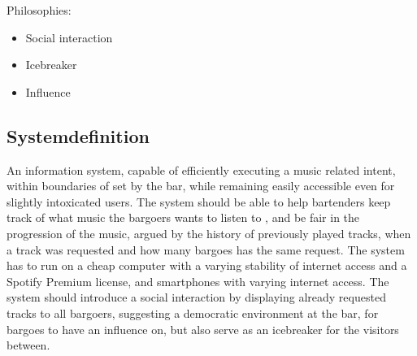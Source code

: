 Philosophies:
\begin{itemize}
	\item Social interaction
	\item Icebreaker	
	\item Influence 
\end{itemize}

\subsection{Systemdefinition}

An information system, capable of efficiently executing a music related intent, within boundaries of set by the bar, while remaining easily accessible even for slightly intoxicated users.  The system should be able to help bartenders keep track of what music the bargoers wants to listen to , and be fair in the progression of the music, argued by the history of previously played tracks, when a track was requested and how many bargoes has the same request. The system has to run on a cheap computer with a varying stability of internet access and a Spotify Premium license, and smartphones with varying internet access. The system should introduce a social interaction by displaying already requested tracks to all bargoers, suggesting a democratic environment at the bar, for bargoes to have an influence on, but also serve as an icebreaker for the visitors between.
